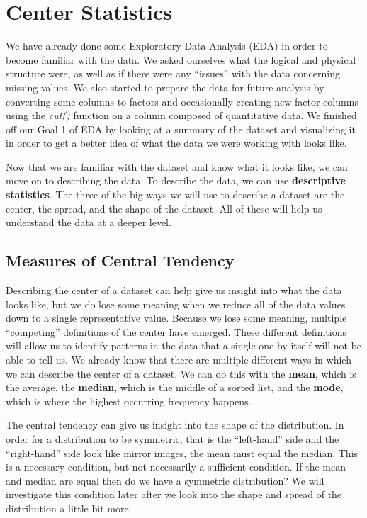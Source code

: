 \documentclass[
  letterpaper,
  DIV=11,
  numbers=noendperiod]{scrreprt}
\begin{document}
\section{Center Statistics}\label{center-statistics}

We have already done some Exploratory Data Analysis (EDA) in order to
become familiar with the data. We asked ourselves what the logical and
physical structure were, as well as if there were any ``issues'' with
the data concerning missing values. We also started to prepare the data
for future analysis by converting some columns to factors and
occasionally creating new factor columns using the \emph{cut()} function
on a column composed of quantitative data. We finished off our Goal 1 of
EDA by looking at a summary of the dataset and visualizing it in order
to get a better idea of what the data we were working with looks like.

Now that we are familiar with the dataset and know what it looks like,
we can move on to describing the data. To describe the data, we can use
\textbf{descriptive statistics}. The three of the big ways we will use
to describe a dataset are the center, the spread, and the shape of the
dataset. All of these will help us understand the data at a deeper
level.

\subsection{Measures of Central
Tendency}\label{measures-of-central-tendency}

Describing the center of a dataset can help give us insight into what
the data looks like, but we do lose some meaning when we reduce all of
the data values down to a single representative value. Because we lose
some meaning, multiple ``competing'' definitions of the center have
emerged. These different definitions will allow us to identify patterns
in the data that a single one by itself will not be able to tell us. We
already know that there are multiple different ways in which we can
describe the center of a dataset. We can do this with the \textbf{mean},
which is the average, the \textbf{median}, which is the middle of a
sorted list, and the \textbf{mode}, which is where the highest occurring
frequency happens.

The central tendency can give us insight into the shape of the
distribution. In order for a distribution to be symmetric, that is the
``left-hand'' side and the ``right-hand'' side look like mirror images,
the mean must equal the median. This is a necessary condition, but not
necessarily a sufficient condition. If the mean and median are equal
then do we have a symmetric distribution? We will investigate this
condition later after we look into the shape and spread of the
distribution a little bit more.
\end{document}
